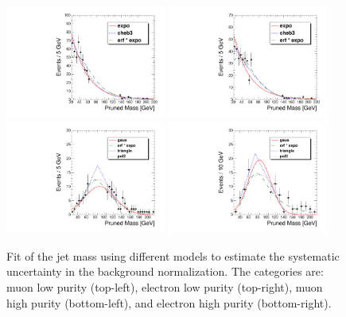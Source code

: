 \begin{figure}[hb!]
\begin{center}
\includegraphics[width=0.47\textwidth]{figures/fits/thiagoFitMLP.pdf}
\includegraphics[width=0.47\textwidth]{figures/fits/thiagoFitELP.pdf}\\
\includegraphics[width=0.47\textwidth]{figures/fits/thiagoFitMHP.pdf}
\includegraphics[width=0.47\textwidth]{figures/fits/thiagoFitEHP.pdf}
\caption[Jet mass fits in data]{Fit of the jet mass using different models to estimate the systematic uncertainty in the background normalization. The categories are: muon low purity (top-left), electron low purity (top-right), muon high purity (bottom-left), and electron high purity (bottom-right).}
\label{thiagoFits}
\end{center}
\end{figure}

